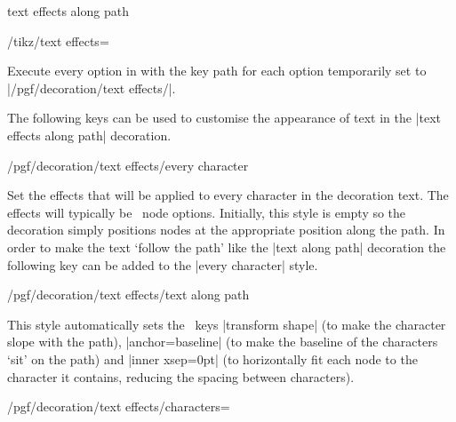 \begin{decoration}{text effects along path}
\begin{key}{/tikz/text effects=}

  Execute every option in  with the
  key path for each option temporarily set to  |/pgf/decoration/text effects/|.
  
\end{key}


  The following keys can be used to customise the
  appearance of text in the |text effects along path|
  decoration.
	 



\begin{stylekey}{/pgf/decoration/text effects/every character}

	Set the effects that will be applied to 
	every character in the decoration text. The effects
	will typically be \tikzname\ node options.
	Initially, this style is empty so the decoration simply positions
	nodes at the appropriate position along the path. In order to
	make the text `follow the path' like the |text along path| decoration
	the following key can be added to the |every character| style. 
	
\end{stylekey}


\begin{stylekey}{/pgf/decoration/text effects/text along path}

	This style automatically sets the \tikzname\ keys 
	|transform shape| (to make the character slope with the path),
	|anchor=baseline| (to make the baseline of the characters `sit' on 
	the path) and |inner xsep=0pt| (to horizontally fit each node to the character
	it contains, reducing the spacing between characters).
	
\begin{codeexample}[]

\end{codeexample}
\end{stylekey}


\begin{key}{/pgf/decoration/text effects/characters=}


\end{key}
\end{decoration}
